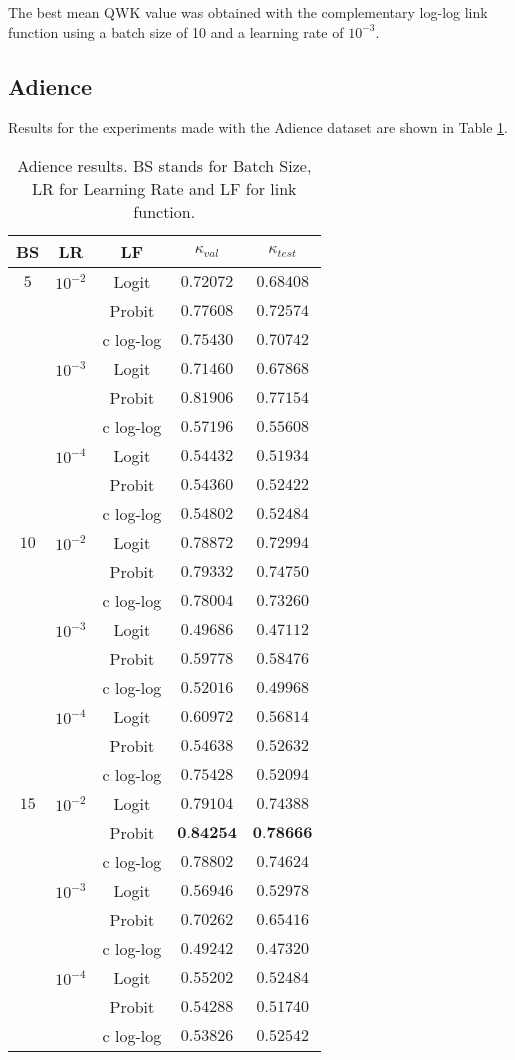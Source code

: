 \documentclass[journal]{IEEEtran}
\begin{document}
	The best mean QWK value was obtained with the complementary log-log link function using a batch size of 10 and a learning rate of $10^{-3}$.
	
	\subsection{Adience}
	\label{sect:adience}
	Results for the experiments made with the Adience dataset are shown in Table \ref{table:Adienceresults}.
	
	\begin{table}[!t]
		\caption{Adience results. BS stands for Batch Size, LR for Learning Rate and LF for link function.}
		\label{table:Adienceresults}
		\footnotesize
		\centering
		\begin{tabular}{ccc|cc}
			BS & LR & LF & $\kappa_{val}$ & $\kappa_{test}$\\\hline
			$5$ & $10^{-2}$ & Logit & $0.72072$ & $0.68408$\\
			& & Probit & $0.77608$ & $0.72574$\\
			& & c log-log & $0.75430$ & $0.70742$\\
			& $10^{-3}$ & Logit & $0.71460$ & $0.67868$\\
			& & Probit & $0.81906$ & $0.77154$\\
			& & c log-log & $0.57196$ & $0.55608$\\
			& $10^{-4}$ & Logit & $0.54432$ & $0.51934$\\
			& & Probit & $0.54360$ & $0.52422$\\
			& & c log-log & $0.54802$ & $0.52484$\\
			$10$ & $10^{-2}$ & Logit & $0.78872$ & $0.72994$\\
			& & Probit & $0.79332$ & $0.74750$\\
			& & c log-log & $0.78004$ & $0.73260$\\
			& $10^{-3}$ & Logit & $0.49686$ & $0.47112$\\
			& & Probit & $0.59778$ & $0.58476$\\
			& & c log-log & $0.52016$ & $0.49968$\\
			& $10^{-4}$ & Logit & $0.60972$ & $0.56814$\\
			& & Probit & $0.54638$ & $0.52632$\\
			& & c log-log & $0.75428$ & $0.52094$\\
			$15$ & $10^{-2}$ & Logit & $0.79104$ & $0.74388$\\
			& & Probit & $\textbf{0.84254}$ & $\textbf{0.78666}$\\
			& & c log-log & $0.78802$ & $0.74624$\\
			& $10^{-3}$ & Logit & $0.56946$ & $0.52978$\\
			& & Probit & $0.70262$ & $0.65416$\\
			& & c log-log & $0.49242$ & $0.47320$\\
			& $10^{-4}$ & Logit & $0.55202$ & $0.52484$\\
			& & Probit & $0.54288$ & $0.51740$\\
			& & c log-log & $0.53826$ & $0.52542$
		\end{tabular}
		
	\end{table}
	
\end{document}
